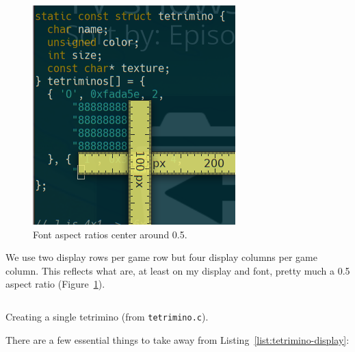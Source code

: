 \documentclass[letterpaper,10pt]{article}
\begin{document}
\begin{figure}[!htbp]
\centering \includegraphics[width=.5\linewidth]{media/screenruler.png}
\caption{Font aspect ratios center around 0.5.}
\label{fig:aspectratio}
\end{figure}

We use two display rows per game row but four display columns per game column.
This reflects what are, at least on my display and font, pretty much a 0.5
aspect ratio (Figure~\ref{fig:aspectratio}).

\begin{listing}[!htbp]
\inputminted[]{C}{code/tetrimino-display.h}
\caption{Creating a single tetrimino (from \texttt{tetrimino.c}).}
\label{list:tetrimino-display}
\end{listing}

There are a few essential things to
take away from Listing~\ref{list:tetrimino-display}:
\end{document}

